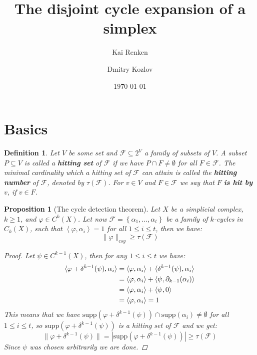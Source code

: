 \documentclass{article}
\title{The disjoint cycle expansion of a simplex}
\author{Kai Renken \and Dmitry Kozlov}
\date{\today}
\newcommand{\supp}{\mathrm{supp}}
\newtheorem{defi}{Definition}[section]
\newtheorem{prop}{Proposition}[section]
\begin{document}
\maketitle


\begin{abstract}

\end{abstract}

\section{Basics}

\begin{defi}
Let $V$ be some set and $\mathcal{F}\subseteq 2^V$ a family of subsets of $V$. A subset $P\subseteq V$ is called a \textbf{hitting set} of $\mathcal{F}$ if we have $P\cap F\neq\emptyset$ for all $F\in\mathcal{F}$. The minimal cardinality which a hitting set of $\mathcal{F}$ can attain is called the \textbf{hitting number} of $\mathcal{F}$, denoted by $\tau(\mathcal{F})$. For $v\in V$ and $F\in\mathcal{F}$ we say that $F$ \textbf{is hit by} $v$, if $v\in F$.
\end{defi}

\begin{prop}[The cycle detection theorem]\label{proposition1}
Let $X$ be a simplicial complex, $k\geq 1$, and $\varphi\in C^k(X)$. Let now $\mathcal{F}=\left\{\alpha_1,\ldots,\alpha_t\right\}$ be a family of $k$-cycles in $C_k(X)$, such that $\left\langle\varphi,\alpha_i\right\rangle=1$ for all $1\leq i\leq t$, then we have:
\[
\|\varphi\|_{csy}\geq\tau(\mathcal{F})
\]
\begin{proof}
Let $\psi\in C^{k-1}(X)$, then for any $1\leq i\leq t$ we have:
\begin{align}
\langle\varphi+\delta^{k-1}(\psi),\alpha_i\rangle&=\langle\varphi,\alpha_i\rangle+\langle\delta^{k-1}(\psi),\alpha_i\rangle\notag\\
&=\langle\varphi,\alpha_i\rangle+\langle\psi,\partial_{k-1}(\alpha_i)\rangle\notag\\
&=\langle\varphi,\alpha_i\rangle+\langle\psi,0\rangle\notag\\
&=\langle\varphi,\alpha_i\rangle=1\notag
\end{align}
This means that we have $\supp(\varphi+\delta^{k-1}(\psi))\cap \supp(\alpha_i)\neq\emptyset$ for all $1\leq i\leq t$, so $\supp(\varphi+\delta^{k-1}(\psi))$ is a hitting set of $\mathcal{F}$ and we get:
\[
\|\varphi+\delta^{k-1}(\psi)\|=|\supp(\varphi+\delta^{k-1}(\psi))|\geq\tau(\mathcal{F})
\]
Since $\psi$ was chosen arbitrarily we are done.
\end{proof}
\end{prop}
\end{document}
